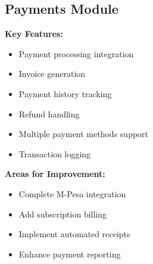 \subsection{Payments Module}
\begin{tcolorbox}[
    enhanced,
    title={Payments Module: 70\% Complete},
    attach boxed title to top left,
    boxed title style={
        colback=warning!50,
        colframe=warning!50,
        arc=0mm,
    },
    colback=white,
    colframe=warning!50,
    arc=0mm,
    fonttitle=\bfseries
]
    \textbf{Key Features:}
    \begin{itemize}
        \item Payment processing integration
        \item Invoice generation
        \item Payment history tracking
        \item Refund handling
        \item Multiple payment methods support
        \item Transaction logging
    \end{itemize}
    
    \textbf{Areas for Improvement:}
    \begin{itemize}
        \item Complete M-Pesa integration
        \item Add subscription billing
        \item Implement automated receipts
        \item Enhance payment reporting
    \end{itemize}
\end{tcolorbox}

